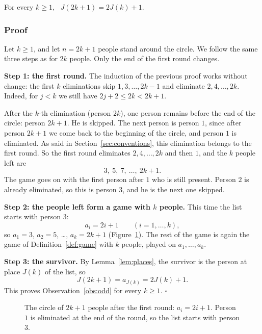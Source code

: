 \begin{obs}\label{obs:odd}
For every $k\geq1$, \ $J(2k+1)=2J(k)+1$.
\end{obs}

\subsubsection{Proof}

Let $k\geq1$, and let $n=2k+1$ people stand around the circle. We follow the
same three steps as for $2k$ people. Only the end of the first round changes.

\textbf{Step 1: the first round.} The induction of the previous proof works
without change: the first $k$ eliminations skip $1,3,\dots,2k-1$ and
eliminate $2,4,\dots,2k$. Indeed, for $j<k$ we still have $2j+2\leq2k<2k+1$.

After the $k$-th elimination (person $2k$), one person remains before the end
of the circle: person $2k+1$. He is skipped. The next person is person $1$,
since after person $2k+1$ we come back to the beginning of the circle, and
person $1$ is eliminated. As said in Section~\ref{sec:conventions}, this elimination belongs to
the first round. So the first round eliminates $2,4,\dots,2k$ and then $1$,
and the $k$ people left are
\[
3,\ 5,\ 7,\ \dots,\ 2k+1 .
\]
The game goes on with the first person after $1$ who is still present.
Person $2$ is already eliminated, so this is person $3$, and he is the next one
skipped.

\textbf{Step 2: the people left form a game with $k$ people.} This time the
list starts with person $3$:
\[
a_i=2i+1\qquad(i=1,\dots,k),
\]
so $a_1=3$, $a_2=5$, \dots, $a_k=2k+1$ (Figure~\ref{fig:odd}). The rest of the
game is again the game of Definition~\ref{def:game} with $k$ people, played on
$a_1,\dots,a_k$.

\textbf{Step 3: the survivor.} By Lemma~\ref{lem:places}, the survivor is
the person at place $J(k)$ of the list, so
\[
J(2k+1)=a_{J(k)}=2J(k)+1 .
\]
This proves Observation~\ref{obs:odd} for every $k\geq1$. \hfill$\square$

\begin{figure}[!ht]
\centering
\renewcommand{\nodesize}{7mm}\renewcommand{\nodefont}{\footnotesize}\footnotesize
{}
\caption{The circle of $2k+1$ people after the first round: $a_i=2i+1$.
Person $1$ is eliminated at the end of the round, so the list starts with
person $3$.}
\label{fig:odd}
\end{figure}

